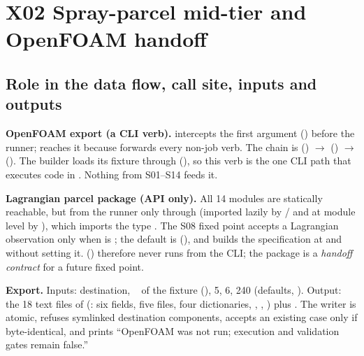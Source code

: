 \section{X02 Spray-parcel mid-tier and OpenFOAM handoff}\label{sec:x02-spray}

\subsection{Role in the data flow, call site, inputs and outputs}

\textbf{OpenFOAM export (a CLI verb).}  intercepts the first argument  () before the runner;  reaches it because  forwards every non-job verb. The chain is  () $\rightarrow$  () $\rightarrow$  (). The builder loads its fixture through  (), so this verb is the one CLI path that executes code in . Nothing from S01--S14 feeds it.

\textbf{Lagrangian parcel package (API only).} All 14  modules are statically reachable, but from the runner only through  (imported lazily by / and at module level by ), which imports the type . The S08 fixed point accepts a Lagrangian observation only when  is ; the default is  (), and  builds the specification at  and  without setting it.  () therefore never runs from the CLI; the package is a \emph{handoff contract} for a future fixed point.

\textbf{Export.} Inputs: destination, ~ of the  fixture (),  5,  6,  240 (defaults, ). Output: the 18 text files of  (: six  fields, five  files, four  dictionaries, , , ) plus . The writer is atomic, refuses symlinked destination components, accepts an existing case only if byte-identical, and prints ``OpenFOAM was not run; execution and validation gates remain false.''

